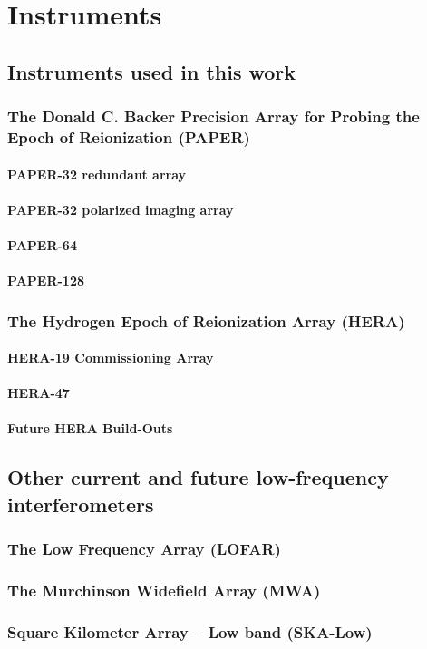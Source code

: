 \chapter{Instruments}
\section{Instruments used in this work}
\subsection{The Donald C. Backer Precision Array for Probing the Epoch of Reionization (PAPER)}
\subsubsection{PAPER-32 redundant array}
\subsubsection{PAPER-32 polarized imaging array}
\subsubsection{PAPER-64}
\subsubsection{PAPER-128}

\subsection{The Hydrogen Epoch of Reionization Array (HERA)}
\subsubsection{HERA-19 Commissioning Array}
\subsubsection{HERA-47}
\subsubsection{Future HERA Build-Outs}

\section{Other current and future low-frequency interferometers}
\subsection{The Low Frequency Array (LOFAR)}
\subsection{The Murchinson Widefield Array (MWA)}
\subsection{Square Kilometer Array -- Low band (SKA-Low)}
